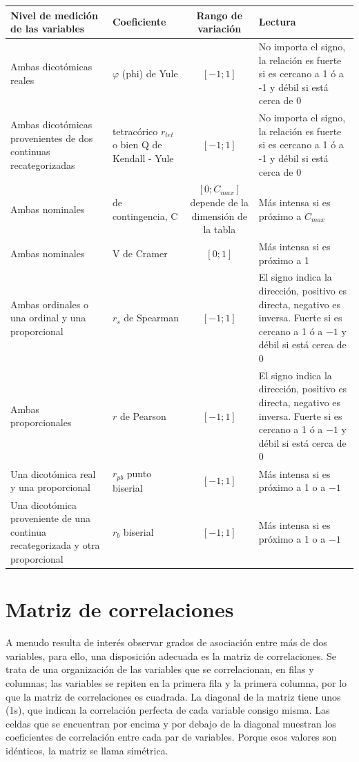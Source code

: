 \documentclass[]{book}
\begin{document}
\begin{longtable}[]{@{}llcl@{}}
\toprule
Nivel de medición de las variables & Coeficiente & Rango de variación & Lectura\tabularnewline
\midrule
\endhead
Ambas dicotómicas reales & \(\varphi\) (phi) de Yule & \([-1; 1]\) & No importa el signo, la relación es fuerte si es cercano a 1 ó a -1 y débil si está cerca de 0\tabularnewline
Ambas dicotómicas provenientes de dos continuas recategorizadas & tetracórico \(r_{tet}\) o bien Q de Kendall - Yule & \([-1; 1]\) & No importa el signo, la relación es fuerte si es cercano a 1 ó a -1 y débil si está cerca de 0\tabularnewline
Ambas nominales & de contingencia, C & \([0; C_{max}]\) depende de la dimensión de la tabla & Más intensa si es próximo a \(C_{max}\)\tabularnewline
Ambas nominales & V de Cramer & \([0; 1]\) & Más intensa si es próximo a 1\tabularnewline
Ambas ordinales o una ordinal y una proporcional & \(r_s\) de Spearman & \([-1; 1]\) & El signo indica la dirección, positivo es directa, negativo es inversa. Fuerte si es cercano a 1 ó a \(-1\) y débil si está cerca de 0\tabularnewline
Ambas proporcionales & \(r\) de Pearson & \([-1; 1]\) & El signo indica la dirección, positivo es directa, negativo es inversa. Fuerte si es cercano a 1 ó a \(-1\) y débil si está cerca de 0\tabularnewline
Una dicotómica real y una proporcional & \(r_{pb}\) punto biserial & \([-1; 1]\) & Más intensa si es próximo a 1 o a \(-1\)\tabularnewline
Una dicotómica proveniente de una continua recategorizada y otra proporcional & \(r_b\) biserial & \([-1; 1]\) & Más intensa si es próximo a 1 o a \(-1\)\tabularnewline
\bottomrule
\end{longtable}

\hypertarget{matriz-de-correlaciones}{%
\section{Matriz de correlaciones}\label{matriz-de-correlaciones}}

A menudo resulta de interés observar grados de asociación entre más de dos variables, para ello, una disposición adecuada es la matriz de correlaciones. Se trata de una organización de las variables que se correlacionan, en filas y columnas; las variables se repiten en la primera fila y la primera columna, por lo que la matriz de correlaciones es cuadrada. La diagonal de la matriz tiene unos (1s), que indican la correlación perfecta de cada variable consigo misma. Las celdas que se encuentran por encima y por debajo de la diagonal muestran los coeficientes de correlación entre cada par de variables. Porque esos valores son idénticos, la matriz se llama simétrica.
\end{document}
